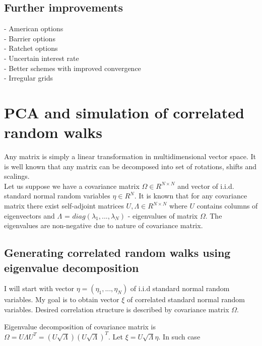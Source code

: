 \documentclass[11pt]{article} %
\newcommand{\euley}{U\sqrt{\Lambda}\eta}
\begin{document}

\subsection{Further improvements}
 - American options\\
 - Barrier options\\
 - Ratchet options\\
 - Uncertain interest rate\\
 - Better schemes with improved convergence\\
 - Irregular grids
 
\appendix
\section{PCA and simulation of correlated random walks}
\label{ap:PCA}

Any matrix is simply a linear transformation in multidimensional vector space. It is well known that any matrix can be decomposed into set of rotations, shifts and scalings. %
\\

Let us suppose we have a covariance matrix $\Omega \in R^{N \times N}$ and vector of i.i.d. standard normal random variables $\eta \in R^N$. It is known that for any covariance matrix there exist self-adjoint matrices $U, \Lambda \in R^{N \times N}$ where $U$ contains columns of eigenvectors and $\Lambda \text{ = } diag(\lambda_1, ..., \lambda_N)$ - eigenvalues of matrix $\Omega$. The eigenvalues are non-negative due to nature of covariance matrix.


\subsection{Generating correlated random walks using eigenvalue decomposition}
I will start with vector $\eta = (\eta_1, ..., \eta_N)$ of i.i.d standard normal random variables. My goal is to obtain vector $\xi$ of correlated standard normal random variables. Desired correlation structure is described by covariance matrix $\Omega$.

Eigenvalue decomposition of covariance matrix is $\Omega = U \Lambda U^T = \left(U\sqrt{\Lambda}\right) \left(U\sqrt{\Lambda}\right)^T$. Let $\xi =\euley$. In such case
\end{document}

